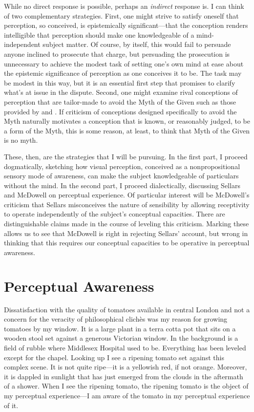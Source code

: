 \documentclass[12pt]{article}
\begin{document}
While no direct response is possible, perhaps an \emph{indirect} response is. I can think of two complementary strategies. First, one might strive to satisfy oneself that perception, so conceived, is epistemically significant---that the conception renders intelligible that perception should make one knowledgeable of a mind-independent subject matter. Of course, by itself, this would fail to persuade anyone inclined to prosecute that charge, but persuading the prosecution is unnecessary to achieve the modest task of setting one's own mind at ease about the epistemic significance of perception as one conceives it to be. The task may be modest in this way, but it is an essential first step that promises to clarify what's at issue in the dispute. Second, one might examine rival conceptions of perception that are tailor-made to avoid the Myth of the Given such as those provided by \citet{Sellars:1956xp} and \citet{McDowell:1996uq,McDowell:1998vn,McDowell:2008fk}. If criticism of conceptions designed specifically to avoid the Myth naturally motivates a conception that is known, or reasonably judged, to be a form of the Myth, this is some reason, at least, to think that Myth of the Given is no myth. 

These, then, are the strategies that I will be pursuing. In the first part, I proceed dogmatically, sketching how visual perception, conceived as a nonpropositional sensory mode of awareness, can make the subject knowledgeable of particulars without the mind. In the second part, I proceed dialectically, discussing Sellars and McDowell on perceptual experience. Of particular interest will be McDowell's criticism that Sellars misconceives the nature of sensibility by allowing receptivity to operate independently of the subject's conceptual capacities. There are distinguishable claims made in the course of leveling this criticism. Marking these allows us to see that McDowell is right in rejecting Sellars' account, but wrong in thinking that this requires our conceptual capacities to be operative in perceptual awareness.


\section{Perceptual Awareness} %
\label{sec:perceptual_awareness}

Dissatisfaction with the quality of tomatoes available in central London and not a concern for the veracity of philosophical clichès was my reason for growing tomatoes by my window. It is a large plant in a terra cotta pot that sits on a wooden stool set against a generous Victorian window. In the background is a field of rubble where Middlesex Hospital used to be. Everything has been leveled except for the chapel. Looking up I see a ripening tomato set against this complex scene. It is not quite ripe---it is a yellowish red, if not orange. Moreover, it is dappled in sunlight that has just emerged from the clouds in the aftermath of a shower. When I see the ripening tomato, the ripening tomato is the object of my perceptual experience---I am aware of the tomato in my perceptual experience of it. 
\end{document}
